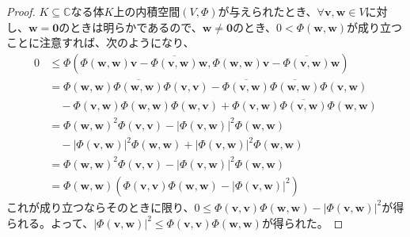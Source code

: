 \documentclass[dvipdfmx]{jsarticle}
\begin{document}
\begin{proof}
$K \subseteq \mathbb{C}$なる体$K$上の内積空間$(V,\varPhi)$が与えられたとき、$\forall\mathbf{v},\mathbf{w} \in V$に対し、$\mathbf{w} = \mathbf{0}$のときは明らかであるので、$\mathbf{w} \neq \mathbf{0}$のとき、$0 < \varPhi\left( \mathbf{w},\mathbf{w} \right)$が成り立つことに注意すれば、次のようになり、
\begin{align*}
0 &\leq \varPhi\left( \varPhi\left( \mathbf{w},\mathbf{w} \right)\mathbf{v} - \overline{\varPhi\left( \mathbf{v},\mathbf{w} \right)}\mathbf{w,}\varPhi\left( \mathbf{w},\mathbf{w} \right)\mathbf{v} - \overline{\varPhi\left( \mathbf{v},\mathbf{w} \right)}\mathbf{w} \right)\\
&= \varPhi\left( \mathbf{w},\mathbf{w} \right)\overline{\varPhi\left( \mathbf{w},\mathbf{w} \right)}\varPhi\left( \mathbf{v,v} \right) - \overline{\varPhi\left( \mathbf{v},\mathbf{w} \right)}\overline{\varPhi\left( \mathbf{w},\mathbf{w} \right)}\varPhi\left( \mathbf{v,w} \right) \\
&\quad - \varPhi\left( \mathbf{v},\mathbf{w} \right)\varPhi\left( \mathbf{w},\mathbf{w} \right)\varPhi\left( \mathbf{w,v} \right) + \varPhi\left( \mathbf{v},\mathbf{w} \right)\overline{\varPhi\left( \mathbf{v},\mathbf{w} \right)}\varPhi\left( \mathbf{w,w} \right)\\
&= {\varPhi\left( \mathbf{w},\mathbf{w} \right)}^{2}\varPhi\left( \mathbf{v,v} \right) - \left| \varPhi\left( \mathbf{v},\mathbf{w} \right) \right|^{2}\varPhi\left( \mathbf{w},\mathbf{w} \right) \\
&\quad - \left| \varPhi\left( \mathbf{v},\mathbf{w} \right) \right|^{2}\varPhi\left( \mathbf{w},\mathbf{w} \right) + \left| \varPhi\left( \mathbf{v},\mathbf{w} \right) \right|^{2}\varPhi\left( \mathbf{w},\mathbf{w} \right)\\
&= {\varPhi\left( \mathbf{w},\mathbf{w} \right)}^{2}\varPhi\left( \mathbf{v,v} \right) - \left| \varPhi\left( \mathbf{v},\mathbf{w} \right) \right|^{2}\varPhi\left( \mathbf{w},\mathbf{w} \right)\\
&= \varPhi\left( \mathbf{w},\mathbf{w} \right)\left( \varPhi\left( \mathbf{v,v} \right)\varPhi\left( \mathbf{w},\mathbf{w} \right) - \left| \varPhi\left( \mathbf{v},\mathbf{w} \right) \right|^{2} \right)
\end{align*}
これが成り立つならそのときに限り、$0 \leq \varPhi\left( \mathbf{v,v} \right)\varPhi\left( \mathbf{w},\mathbf{w} \right) - \left| \varPhi\left( \mathbf{v},\mathbf{w} \right) \right|^{2}$が得られる。よって、$\left| \varPhi\left( \mathbf{v},\mathbf{w} \right) \right|^{2} \leq \varPhi\left( \mathbf{v},\mathbf{v} \right)\varPhi\left( \mathbf{w},\mathbf{w} \right)$が得られた。
\end{proof}
\end{document}
